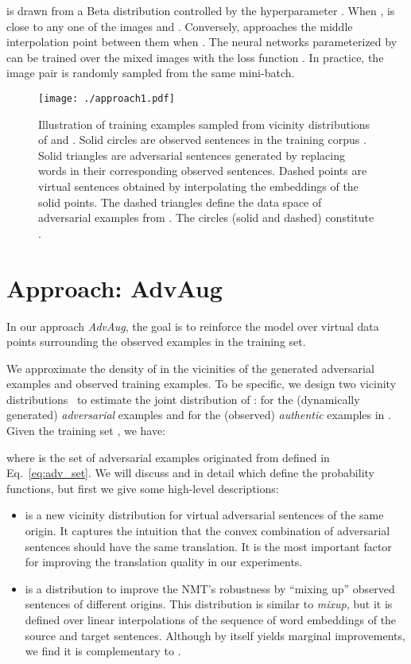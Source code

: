 \documentclass[11pt,a4paper]{article}
\newcommand{\fancyname}{AdvAug}
\newcommand{\mixup}{\textit{mixup}\xspace}
\begin{document}
 is drawn from a Beta distribution  controlled by the hyperparameter .
When ,  is close to any one of the images  and .
Conversely,  approaches the middle interpolation point between them when . 
The neural networks  parameterized by  can be trained over the mixed images  with the loss function
. In practice, the image pair is randomly sampled from the same mini-batch.



\begin{figure}[!t]
\centering
\texttt{[image: ./approach1.pdf]} 
\caption{Illustration of training examples sampled from vicinity distributions of  and . Solid circles are observed sentences in the training corpus . Solid triangles are adversarial sentences generated by replacing words in their corresponding observed sentences. 
Dashed points are virtual sentences obtained by interpolating the embeddings of the solid points. 
The dashed triangles define the data space of adversarial examples from . The circles (solid and dashed) constitute .} \label{figure:approach} 
\label{fig:train}
\end{figure}

\section{Approach: \fancyname}
In our approach {\em \fancyname}, the goal is to reinforce the model over virtual data points surrounding the observed examples in the training set.

We approximate the density of  in the vicinities of the generated adversarial examples and observed training examples. To be specific, we design two vicinity distributions~\cite{chapelle2001vicinal} to estimate the joint distribution of :  for the (dynamically generated) \emph{adversarial} examples and  for the (observed) \emph{authentic} examples in . Given the training set , we have:

where  is the set of adversarial examples originated from  defined in Eq.~\eqref{eq:adv_set}. We will discuss  and  in detail which define the probability functions, but first we give some high-level descriptions:
\begin{itemize}[leftmargin=*]
    \item  is a new vicinity distribution for virtual adversarial sentences of the same origin. It captures the intuition that the convex combination of adversarial sentences should have the same translation. It is the most important factor for improving the translation quality in our experiments.
    \item  is a distribution to improve the NMT's robustness by ``mixing up'' observed sentences of different origins. This distribution is similar to \mixup, but it is defined over linear interpolations of the sequence of word embeddings of the source and target sentences. Although  by itself yields marginal improvements, we find it is complementary to .
\end{itemize}
\end{document}
